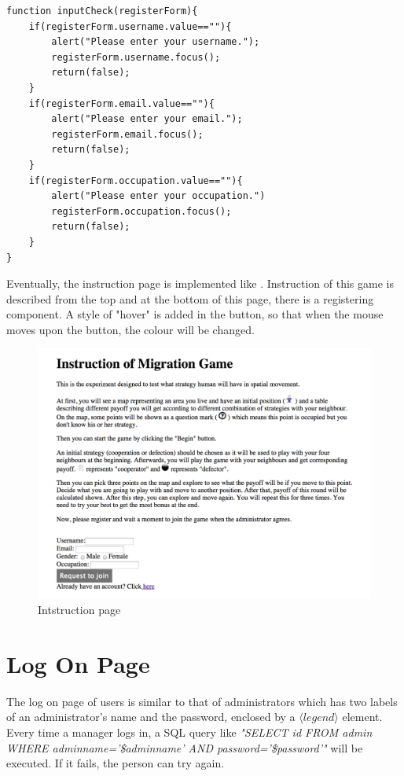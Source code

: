 \begin{lstlisting}[caption=User data validation segment]
function inputCheck(registerForm){
	if(registerForm.username.value==""){
		alert("Please enter your username.");
		registerForm.username.focus();
		return(false);
	}
	if(registerForm.email.value==""){
		alert("Please enter your email.");
		registerForm.email.focus();
		return(false);
	}
	if(registerForm.occupation.value==""){
		alert("Please enter your occupation.")
		registerForm.occupation.focus();
		return(false);
	}
}

\end{lstlisting}
Eventually, the instruction page is implemented like . Instruction of this game is described from the top and at the bottom of this page, there is a registering component. A style of "hover" is added in the button, so that when the mouse moves upon the button, the colour will be changed.
\begin{figure}[!htb]
  \centering
  \includegraphics[width=14cm]{instruction.png}
  \caption{Intstruction page}
  \label{Figure:intro}
\end{figure}


\section{Log On Page}
The log on page of users is similar to that of administrators which has two labels of an administrator's name and the password, enclosed by a $\langle legend \rangle$ element. Every time a manager logs in, a SQL query like \textit{"SELECT id FROM admin WHERE adminname='\$adminname' AND password='\$password'" }will be executed. If it fails, the person can try again.


